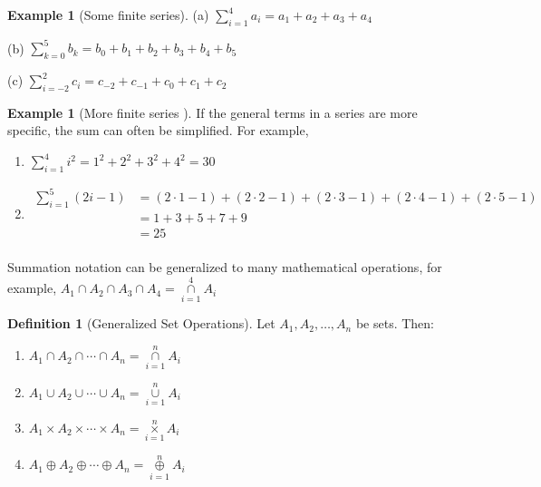 \documentclass[10pt,]{book}
\theoremstyle{plain}
\theoremstyle{definition}
\newtheorem{definition}[theorem]{Definition}
\theoremstyle{definition}
\theoremstyle{definition}
\newtheorem{example}[theorem]{Example}
\theoremstyle{definition}
\begin{document}
%
\begin{example}[Some finite series]\label{some_finite_series}
(a)  \(\sum_{i=1}^4 a_i= a_1+ a_2+a_3+a_4\)%
\par
(b) \(\sum_{k=0}^5 b_k=b_0+b_1+b_2+b_3+b_4+b_5\)%
\par
(c) \(\sum_{i=-2}^2 c_i=c_{-2}+c_{-1}+c_0+c_1+c_2\)%
\end{example}
\begin{example}[More finite series ]\label{more_finite_series}
If the general terms in a series are more specific, the sum can often be simplified. For example,%
\par
\leavevmode%
\begin{enumerate}[label=\alph*]
\item\hypertarget{li-214}{} \(\sum_{i=1}^4 i^2=1^2+2^2+3^2+4^2=30\) %
\item\hypertarget{li-215}{}
	\begin{equation*}
	\begin{split}
	\sum_{i=1}^5 (2i-1)&=(2\cdot 1-1)+(2\cdot 2-1)+(2\cdot 3-1)+(2\cdot 4-1)+(2\cdot 5-1)\\
    & =1+3+5+7+9\\
    & =25\\
    \end{split}
    \end{equation*}%
\end{enumerate}
%
\end{example}
\par
Summation notation can be generalized to many mathematical operations, for example, 
\(A_1\cap A_2\cap A_3\cap A_4=\underset{i=1}{\overset{4}{\cap }}A_i\) %
\begin{definition}[Generalized Set Operations]\label{generalized-set-operations}
Let \(A_1, A_2, \ldots , A_n\) be sets. Then: %
\par
\leavevmode%
\begin{enumerate}[label=\alph*]
\item\hypertarget{li-216}{}  \(A_1\cap A_2\cap \cdots \cap A_n=\underset{i=1}{\overset{n}{\cap }}A_i\)%
\item\hypertarget{li-217}{}   \(A_1\cup A_2\cup \cdots \cup A_n=\underset{i=1}{\overset{n}{\cup }}A_i\)%
\item\hypertarget{li-218}{}   \(A_1\times A_2\times \cdots \times A_n=\underset{i=1}{\overset{n}{\times }}A_i\)%
\item\hypertarget{li-219}{}   \(A_1\oplus A_2\oplus \cdots \oplus A_n=\underset{i=1}{\overset{n}{\oplus }}A_i\)%
\end{enumerate}
%
\end{definition}
\end{document}
